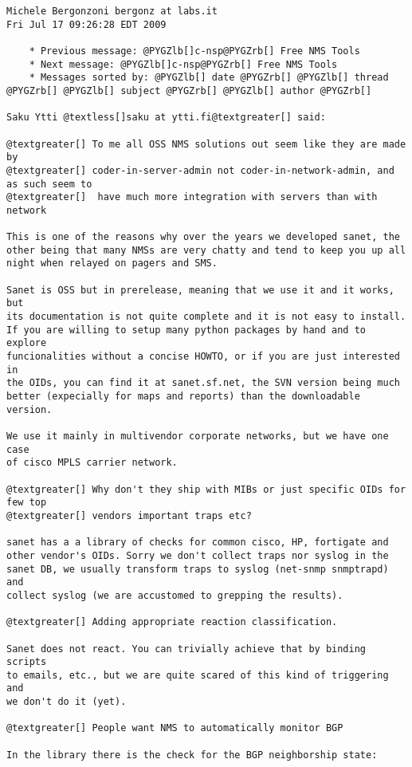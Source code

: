 \documentclass[a4wide,10pt,italian]{manual}
\begin{document}
\begin{Verbatim}[commandchars=@\[\]]
Michele Bergonzoni bergonz at labs.it
Fri Jul 17 09:26:28 EDT 2009

    * Previous message: @PYGZlb[]c-nsp@PYGZrb[] Free NMS Tools
    * Next message: @PYGZlb[]c-nsp@PYGZrb[] Free NMS Tools
    * Messages sorted by: @PYGZlb[] date @PYGZrb[] @PYGZlb[] thread @PYGZrb[] @PYGZlb[] subject @PYGZrb[] @PYGZlb[] author @PYGZrb[]

Saku Ytti @textless[]saku at ytti.fi@textgreater[] said:

@textgreater[] To me all OSS NMS solutions out seem like they are made by
@textgreater[] coder-in-server-admin not coder-in-network-admin, and as such seem to
@textgreater[]  have much more integration with servers than with network

This is one of the reasons why over the years we developed sanet, the
other being that many NMSs are very chatty and tend to keep you up all
night when relayed on pagers and SMS.

Sanet is OSS but in prerelease, meaning that we use it and it works, but
its documentation is not quite complete and it is not easy to install.
If you are willing to setup many python packages by hand and to explore
funcionalities without a concise HOWTO, or if you are just interested in
the OIDs, you can find it at sanet.sf.net, the SVN version being much
better (expecially for maps and reports) than the downloadable version.

We use it mainly in multivendor corporate networks, but we have one case
of cisco MPLS carrier network.

@textgreater[] Why don't they ship with MIBs or just specific OIDs for few top
@textgreater[] vendors important traps etc?

sanet has a a library of checks for common cisco, HP, fortigate and
other vendor's OIDs. Sorry we don't collect traps nor syslog in the
sanet DB, we usually transform traps to syslog (net-snmp snmptrapd) and
collect syslog (we are accustomed to grepping the results).

@textgreater[] Adding appropriate reaction classification.

Sanet does not react. You can trivially achieve that by binding scripts
to emails, etc., but we are quite scared of this kind of triggering and
we don't do it (yet).

@textgreater[] People want NMS to automatically monitor BGP

In the library there is the check for the BGP neighborship state:


\end{Verbatim}
\end{document}
